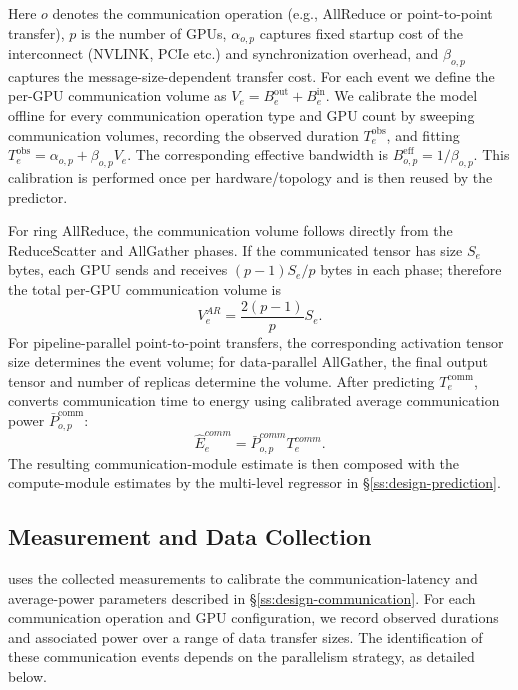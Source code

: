 Here $o$ denotes the communication operation (e.g., AllReduce or point-to-point transfer), $p$ is the number of GPUs, $\alpha_{o,p}$ captures fixed startup cost of the interconnect (NVLINK, PCIe etc.) and synchronization overhead, and $\beta_{o,p}$ captures the message-size-dependent transfer cost. For each event we define the per-GPU communication volume as $V_e=B_e^{\mathrm{out}}+B_e^{\mathrm{in}}$. We calibrate the model offline for every communication operation type and GPU count by sweeping communication volumes, recording the observed duration $T_e^{\mathrm{obs}}$, and fitting $T_e^{\mathrm{obs}}=\alpha_{o,p}+\beta_{o,p}V_e$. The corresponding effective bandwidth is $B^{\mathrm{eff}}_{o,p}=1/\beta_{o,p}$. This calibration is performed once per hardware/topology and is then reused by the predictor.

For ring AllReduce, the communication volume follows directly from the ReduceScatter and AllGather phases. If the communicated tensor has size $S_e$ bytes, each GPU sends and receives $(p-1)S_e/p$ bytes in each phase; therefore the total per-GPU communication volume is
\begin{equation}
V_e^{AR}=\frac{2(p-1)}{p}S_e.
\label{eq:allreduce_volume}
\end{equation}
For pipeline-parallel point-to-point transfers, the corresponding activation tensor size determines the event volume; for data-parallel AllGather, the final output tensor and number of replicas determine the volume. After predicting $T_e^{\mathrm{comm}}$, \sys{} converts communication time to energy using calibrated average communication power $\bar{P}^{\mathrm{comm}}_{o,p}$:
\begin{equation}
\widehat{E}^{comm}_e=\bar{P}^{comm}_{o,p}T_e^{comm}.
\label{eq:comm_energy}
\end{equation}
The resulting communication-module estimate is then composed with the compute-module estimates by the multi-level regressor in \S\ref{ss:design-prediction}.


\subsection{Measurement and Data Collection}
\label{ss:design-measurement}
\sys{} uses the collected measurements to calibrate the communication-latency and average-power parameters described in \S\ref{ss:design-communication}. For each communication operation and GPU configuration, we record observed durations and associated power over a range of data transfer sizes. The identification of these communication events depends on the parallelism strategy, as detailed below.

